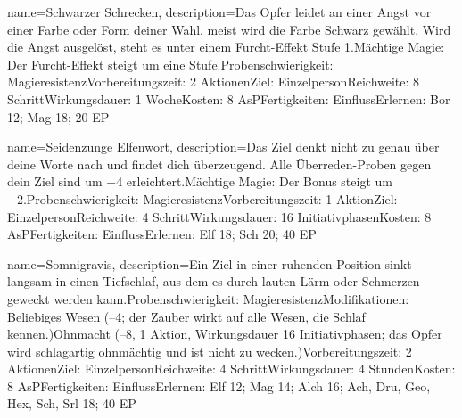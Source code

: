{
    name={Schwarzer Schrecken},
    description={Das Opfer leidet an einer Angst vor einer Farbe oder Form deiner Wahl, meist wird die Farbe Schwarz gewählt. Wird die Angst ausgelöst, steht es unter einem Furcht-Effekt Stufe 1.\newline Mächtige Magie: Der Furcht-Effekt steigt um eine Stufe.\newline Probenschwierigkeit: Magieresistenz\newline Vorbereitungszeit: 2 Aktionen\newline Ziel: Einzelperson\newline Reichweite: 8 Schritt\newline Wirkungsdauer: 1 Woche\newline Kosten: 8 AsP\newline Fertigkeiten: Einfluss\newline Erlernen: Bor 12; Mag 18; 20 EP}
}


{
    name={Seidenzunge Elfenwort},
    description={Das Ziel denkt nicht zu genau über deine Worte nach und findet dich überzeugend. Alle Überreden-Proben gegen dein Ziel sind um +4 erleichtert.\newline Mächtige Magie: Der Bonus steigt um +2.\newline Probenschwierigkeit: Magieresistenz\newline Vorbereitungszeit: 1 Aktion\newline Ziel: Einzelperson\newline Reichweite: 4 Schritt\newline Wirkungsdauer: 16 Initiativphasen\newline Kosten: 8 AsP\newline Fertigkeiten: Einfluss\newline Erlernen: Elf 18; Sch 20; 40 EP}
}


{
    name={Somnigravis},
    description={Ein Ziel in einer ruhenden Position sinkt langsam in einen Tiefschlaf, aus dem es durch lauten Lärm oder Schmerzen geweckt werden kann.\newline Probenschwierigkeit: Magieresistenz\newline Modifikationen: Beliebiges Wesen (–4; der Zauber wirkt auf alle Wesen, die Schlaf kennen.)\newline Ohnmacht (–8, 1 Aktion, Wirkungsdauer 16 Initiativphasen; das Opfer wird schlagartig ohnmächtig und ist nicht zu wecken.)\newline Vorbereitungszeit: 2 Aktionen\newline Ziel: Einzelperson\newline Reichweite: 4 Schritt\newline Wirkungsdauer: 4 Stunden\newline Kosten: 8 AsP\newline Fertigkeiten: Einfluss\newline Erlernen: Elf 12; Mag 14; Alch 16; Ach, Dru, Geo, Hex, Sch, Srl 18; 40 EP}
}



